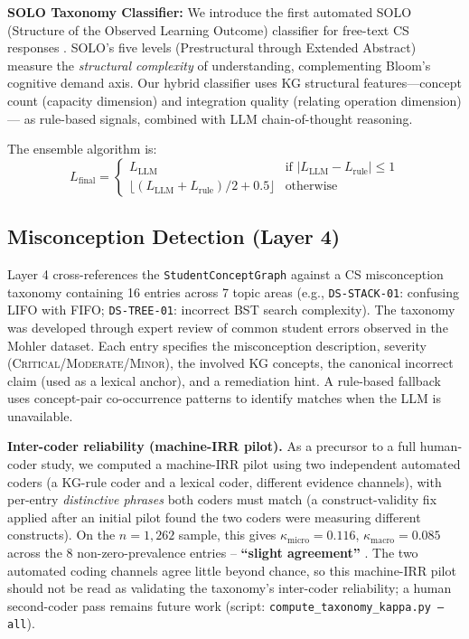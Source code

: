 \documentclass[conference]{IEEEtran}
\begin{document}
\textbf{SOLO Taxonomy Classifier:} We introduce the first automated SOLO
(Structure of the Observed Learning Outcome) classifier for free-text CS responses
\cite{biggs1982}. SOLO's five levels (Prestructural through Extended Abstract)
measure the \emph{structural complexity} of understanding, complementing Bloom's
cognitive demand axis. Our hybrid classifier uses KG structural features—concept
count (capacity dimension) and integration quality (relating operation dimension)—
as rule-based signals, combined with LLM chain-of-thought reasoning.

The ensemble algorithm is:
\begin{equation}
  L_{\text{final}} =
  \begin{cases}
    L_{\text{LLM}} & \text{if } |L_{\text{LLM}} - L_{\text{rule}}| \leq 1 \\
    \lfloor(L_{\text{LLM}} + L_{\text{rule}}) / 2 + 0.5\rfloor & \text{otherwise}
  \end{cases}
  \label{eq:ensemble}
\end{equation}

\subsection{Misconception Detection (Layer 4)}

Layer 4 cross-references the \texttt{StudentConceptGraph} against a
CS misconception taxonomy containing 16 entries across 7 topic areas
(e.g., \texttt{DS-STACK-01}: confusing LIFO with FIFO;
\texttt{DS-TREE-01}: incorrect BST search complexity).
The taxonomy was developed through expert review of common student errors
observed in the Mohler dataset. Each entry specifies the misconception
description, severity (\textsc{Critical}/\textsc{Moderate}/\textsc{Minor}), the
involved KG concepts, the canonical incorrect claim (used as a lexical anchor),
and a remediation hint. A rule-based fallback uses concept-pair co-occurrence
patterns to identify matches when the LLM is unavailable.

\textbf{Inter-coder reliability (machine-IRR pilot).} As a precursor
to a full human-coder study, we computed a machine-IRR pilot using two
independent automated coders (a KG-rule coder and a lexical coder,
different evidence channels), with per-entry \emph{distinctive
phrases} both coders must match (a construct-validity fix applied
after an initial pilot found the two coders were measuring different
constructs). On the $n=1{,}262$ sample, this gives
$\kappa_{\text{micro}}=0.116$, $\kappa_{\text{macro}}=0.085$ across
the 8 non-zero-prevalence entries -- \textbf{``slight agreement''}
\cite{Landis1977}. The two automated coding channels agree little
beyond chance, so this machine-IRR pilot should not be read as
validating the taxonomy's inter-coder reliability; a human
second-coder pass remains future work (script:
\texttt{compute\_taxonomy\_kappa.py --all}).
\end{document}
